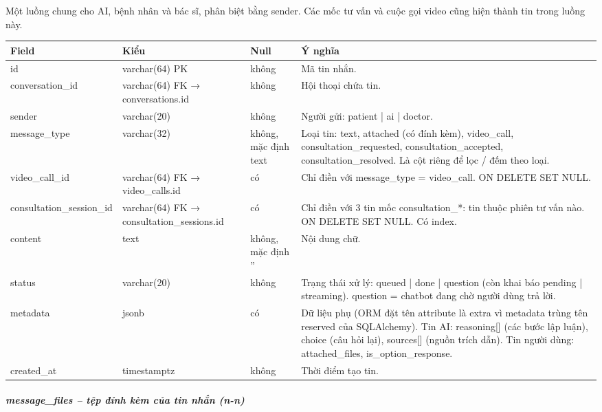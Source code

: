 Một luồng chung cho AI, bệnh nhân và bác sĩ, phân biệt bằng sender. Các mốc tư vấn và cuộc gọi video cũng hiện thành tin trong luồng này.
\begin{longtable}{|>{\raggedright\arraybackslash}p{0.214\dimexpr\linewidth-8\tabcolsep\relax}|>{\raggedright\arraybackslash}p{0.230\dimexpr\linewidth-8\tabcolsep\relax}|>{\raggedright\arraybackslash}p{0.220\dimexpr\linewidth-8\tabcolsep\relax}|>{\raggedright\arraybackslash}p{0.336\dimexpr\linewidth-8\tabcolsep\relax}|}
\hline
\textbf{Field} & \textbf{Kiểu} & \textbf{Null} & \textbf{Ý nghĩa} \\ \hline
\endhead
id & varchar(64) PK & không & Mã tin nhắn. \\ \hline
conversation\_id & varchar(64) FK → conversations.id & không & Hội thoại chứa tin. \\ \hline
sender & varchar(20) & không & Người gửi: patient | ai | doctor. \\ \hline
message\_type & varchar(32) & không, mặc định text & Loại tin: text, attached (có đính kèm), video\_call, consultation\_requested, consultation\_accepted, consultation\_resolved. Là cột riêng để lọc / đếm theo loại. \\ \hline
video\_call\_id & varchar(64) FK → video\_calls.id & có & Chỉ điền với message\_type = video\_call. ON DELETE SET NULL. \\ \hline
consultation\_session\_id & varchar(64) FK → consultation\_sessions.id & có & Chỉ điền với 3 tin mốc consultation\_*: tin thuộc phiên tư vấn nào. ON DELETE SET NULL. Có index. \\ \hline
content & text & không, mặc định '' & Nội dung chữ. \\ \hline
status & varchar(20) & không & Trạng thái xử lý: queued | done | question (còn khai báo pending | streaming). question = chatbot đang chờ người dùng trả lời. \\ \hline
metadata & jsonb & có & Dữ liệu phụ (ORM đặt tên attribute là extra vì metadata trùng tên reserved của SQLAlchemy). Tin AI: reasoning[] (các bước lập luận), choice (câu hỏi lại), sources[] (nguồn trích dẫn). Tin người dùng: attached\_files, is\_option\_response. \\ \hline
created\_at & timestamptz & không & Thời điểm tạo tin. \\ \hline
\end{longtable}

\subparagraph{message\_files -- tệp đính kèm của tin nhắn (n-n)}

